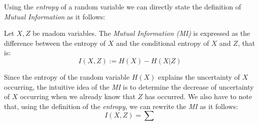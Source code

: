 Using the \emph{entropy} of a random variable we can directly state the definition of \emph{Mutual Information} as it follows:

\begin{ndef}
Let $X,Z$ be rnadom variables. The \emph{Mutual Information (MI)} is expressed as the difference between the entropy of $X$ and the conditional entropy of $X$ and $Z$, that is:
$$
I(X,Z) := H(X) - H(X|Z)
$$
\end{ndef}

Since the entropy of the random variable $H(X)$ explains the uncertainty of $X$ occurring, the intuitive idea of the \emph{MI} is to determine the decrease of uncertainty of $X$ occurring when we already
know that $Z$ has occurred. We also have to note that, using the definition of the \emph{entropy}, we can rewrite the \emph{MI} as it follows:
$$
I(X,Z) = \sum
$$